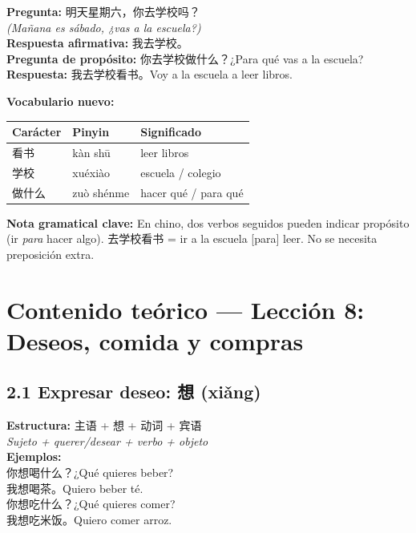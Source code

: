 \documentclass[12pt, a4paper]{article}
\begin{document}
\begin{cuadroazul}
\textbf{Pregunta:} \quad 明天星期六，你去学校吗？\\
\textit{(Mañana es sábado, ¿vas a la escuela?)}\\[4pt]
\textbf{Respuesta afirmativa:} \quad 我去学校。\\[4pt]
\textbf{Pregunta de propósito:} \quad 你去学校做什么？\quad ¿Para qué vas a la escuela?\\[4pt]
\textbf{Respuesta:} \quad 我去学校看书。\quad Voy a la escuela a leer libros.
\end{cuadroazul}

\noindent\textbf{Vocabulario nuevo:}

\begin{center}
\begin{tabular}{lll}
\toprule
\textbf{Carácter} & \textbf{Pinyin} & \textbf{Significado} \\
\midrule
看书 & kàn shū & leer libros \\
学校 & xuéxiào & escuela / colegio \\
做什么 & zuò shénme & hacer qué / para qué \\
\bottomrule
\end{tabular}
\end{center}

\noindent\textbf{Nota gramatical clave:} En chino, dos verbos seguidos pueden indicar propósito (ir \textit{para} hacer algo). \mbox{去学校看书} = ir a la escuela [para] leer. No se necesita preposición extra.

\section{Contenido teórico — Lección 8: Deseos, comida y compras}

\subsection{2.1 Expresar deseo: 想 (xiǎng)}

\begin{cuadroazul}
\textbf{Estructura:} \quad 主语 + 想 + 动词 + 宾语\\
\textit{Sujeto + querer/desear + verbo + objeto}\\[6pt]
\textbf{Ejemplos:}\\
你想喝什么？\quad ¿Qué quieres beber?\\
我想喝茶。\quad Quiero beber té.\\
你想吃什么？\quad ¿Qué quieres comer?\\
我想吃米饭。\quad Quiero comer arroz.
\end{cuadroazul}
\end{document}
